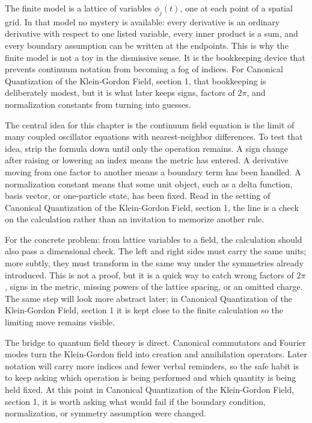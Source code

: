 The finite model is a lattice of variables \(\phi_j(t)\), one at each point of a spatial grid.  In that model no mystery is available: every derivative is an ordinary derivative with respect to one listed variable, every inner product is a sum, and every boundary assumption can be written at the endpoints.  This is why the finite model is not a toy in the dismissive sense.  It is the bookkeeping device that prevents continuum notation from becoming a fog of indices.  For Canonical Quantization of the Klein-Gordon Field, section 1, that bookkeeping is deliberately modest, but it is what later keeps signs, factors of \(2\pi\), and normalization constants from turning into guesses.

The central idea for this chapter is the continuum field equation is the limit of many coupled oscillator equations with nearest-neighbor differences.  To test that idea, strip the formula down until only the operation remains.  A sign change after raising or lowering an index means the metric has entered.  A derivative moving from one factor to another means a boundary term has been handled.  A normalization constant means that some unit object, such as a delta function, basis vector, or one-particle state, has been fixed.  Read in the setting of Canonical Quantization of the Klein-Gordon Field, section 1, the line is a check on the calculation rather than an invitation to memorize another rule.

For the concrete problem: from lattice variables to a field, the calculation should also pass a dimensional check.  The left and right sides must carry the same units; more subtly, they must transform in the same way under the symmetries already introduced.  This is not a proof, but it is a quick way to catch wrong factors of \(2\pi\), signs in the metric, missing powers of the lattice spacing, or an omitted charge.  The same step will look more abstract later; in Canonical Quantization of the Klein-Gordon Field, section 1 it is kept close to the finite calculation so the limiting move remains visible.

The bridge to quantum field theory is direct.  Canonical commutators and Fourier modes turn the Klein-Gordon field into creation and annihilation operators.  Later notation will carry more indices and fewer verbal reminders, so the safe habit is to keep asking which operation is being performed and which quantity is being held fixed.  At this point in Canonical Quantization of the Klein-Gordon Field, section 1, it is worth asking what would fail if the boundary condition, normalization, or symmetry assumption were changed.

